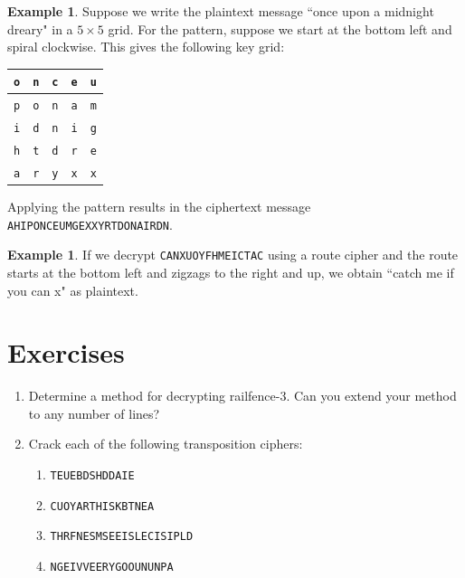 \documentclass{book}
\theoremstyle{plain}
\theoremstyle{definition}
\newtheorem{example}[theorem]{Example}
\newif\ifprintsolutions
\newcommand{\solution}[1]{\ifprintsolutions \begin{sloppypar}{\it #1}\end{sloppypar} \fi} %
\newcommand{\ciphertext}[1]{\texttt{#1}} %
\begin{document}
\begin{example}
Suppose we write the plaintext message ``once upon a midnight dreary" in a $5 \times 5$ grid. For the pattern, suppose we start at the bottom left and spiral clockwise. This gives the following key grid:

\begin{center}
\begin{tabular}{|c|c|c|c|c|}
\hline
\ciphertext{o} & \ciphertext{n} & \ciphertext{c} & \ciphertext{e} & \ciphertext{u} \\
\hline
\ciphertext{p} & \ciphertext{o} & \ciphertext{n} & \ciphertext{a} & \ciphertext{m} \\
\hline
\ciphertext{i} & \ciphertext{d} & \ciphertext{n} & \ciphertext{i} & \ciphertext{g} \\
\hline
\ciphertext{h} & \ciphertext{t} & \ciphertext{d} & \ciphertext{r} & \ciphertext{e} \\
\hline
\ciphertext{a} & \ciphertext{r} & \ciphertext{y} & \ciphertext{x} & \ciphertext{x} \\
\hline
\end{tabular}
\end{center}

Applying the pattern results in the ciphertext message \ciphertext{AHIPONCEUMGEXXYRTDONAIRDN}.
\end{example}

\begin{example}
If we decrypt \ciphertext{CANXUOYFHMEICTAC} using a route cipher and the route starts at the bottom left and zigzags to the right and up, we obtain ``catch me if you can x" as plaintext.
\end{example}

\section{Exercises}
\begin{enumerate}
\item Determine a method for decrypting railfence-3. Can you extend your method to any number of lines?
\item Crack each of the following transposition ciphers:
\begin{enumerate}
\item \ciphertext{TEUEBDSHDDAIE} \solution{Railfence: the dude abides}
\item \ciphertext{CUOYARTHISKBTNEA} \solution{$4 \times 4$ grid, start upper right, counter-clockwise spiral: you can't break this}
\item \ciphertext{THRFNESMSEEISLECISIPLD} \solution{Railfence: tihs rlfence iss mispeled}
\item \ciphertext{NGEIVVEERYGOOUNUNPA} \solution{Even/odd: never gonna give you up}
\end{enumerate}
\end{enumerate}
\end{document}
